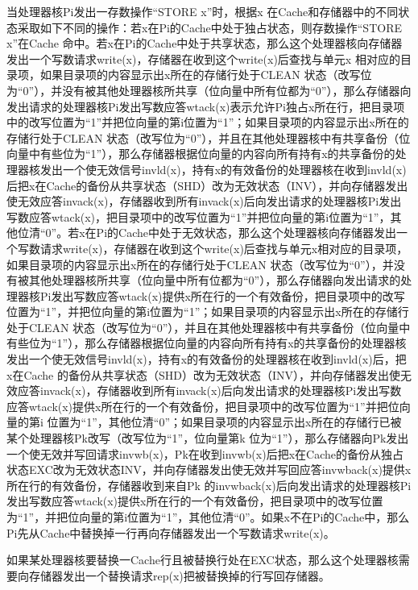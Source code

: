 \documentclass[]{ctexbook}
\begin{document}
当处理器核Pi发出一存数操作``STORE x''时，根据x 在Cache和存储器中的不同状态采取如下不同的操作：若x在Pi的Cache中处于独占状态，则存数操作``STORE x''在Cache 命中。若x在Pi的Cache中处于共享状态，那么这个处理器核向存储器发出一个写数请求write(x)，存储器在收到这个write(x)后查找与单元x 相对应的目录项，如果目录项的内容显示出x所在的存储行处于CLEAN 状态（改写位为``0''），并没有被其他处理器核所共享（位向量中所有位都为``0''），那么存储器向发出请求的处理器核Pi发出写数应答wtack(x)表示允许Pi独占x所在行，把目录项中的改写位置为``1''并把位向量的第i位置为``1''；如果目录项的内容显示出x所在的存储行处于CLEAN 状态（改写位为``0''），并且在其他处理器核中有共享备份（位向量中有些位为``1''），那么存储器根据位向量的内容向所有持有x的共享备份的处理器核发出一个使无效信号invld(x)，持有x的有效备份的处理器核在收到invld(x)后把x在Cache的备份从共享状态（SHD）改为无效状态（INV），并向存储器发出使无效应答invack(x)，存储器收到所有invack(x)后向发出请求的处理器核Pi发出写数应答wtack(x)，把目录项中的改写位置为``1''并把位向量的第i位置为``1''，其他位清``0''。若x在Pi的Cache中处于无效状态，那么这个处理器核向存储器发出一个写数请求write(x)，存储器在收到这个write(x)后查找与单元x相对应的目录项，如果目录项的内容显示出x所在的存储行处于CLEAN 状态（改写位为``0''），并没有被其他处理器核所共享（位向量中所有位都为``0''），那么存储器向发出请求的处理器核Pi发出写数应答wtack(x)提供x所在行的一个有效备份，把目录项中的改写位置为``1''，并把位向量的第i位置为``1''；如果目录项的内容显示出x所在的存储行处于CLEAN 状态（改写位为``0''），并且在其他处理器核中有共享备份（位向量中有些位为``1''），那么存储器根据位向量的内容向所有持有x的共享备份的处理器核发出一个使无效信号invld(x)，持有x的有效备份的处理器核在收到invld(x)后，把x在Cache 的备份从共享状态（SHD）改为无效状态（INV），并向存储器发出使无效应答invack(x)，存储器收到所有invack(x)后向发出请求的处理器核Pi发出写数应答wtack(x)提供x所在行的一个有效备份，把目录项中的改写位置为``1''并把位向量的第i 位置为``1''，其他位清``0''；如果目录项的内容显示出x所在的存储行已被某个处理器核Pk改写（改写位为``1''，位向量第k 位为``1''），那么存储器向Pk发出一个使无效并写回请求invwb(x)，Pk在收到invwb(x)后把x在Cache的备份从独占状态EXC改为无效状态INV，并向存储器发出使无效并写回应答invwback(x)提供x所在行的有效备份，存储器收到来自Pk 的invwback(x)后向发出请求的处理器核Pi发出写数应答wtack(x)提供x所在行的一个有效备份，把目录项中的改写位置为``1''，并把位向量的第i位置为``1''，其他位清``0''。如果x不在Pi的Cache中，那么Pi先从Cache中替换掉一行再向存储器发出一个写数请求write(x)。

如果某处理器核要替换一Cache行且被替换行处在EXC状态，那么这个处理器核需要向存储器发出一个替换请求rep(x)把被替换掉的行写回存储器。
\end{document}
